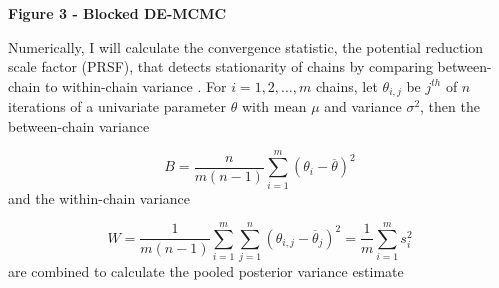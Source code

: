 \documentclass[12pt]{article}
\begin{document}
\vspace{5mm}

\centerline{\textbf{Figure 3 - Blocked DE-MCMC}}

\vspace{5mm}
	
    Numerically, I will calculate the \citet{GelRub1992} convergence statistic, the potential reduction scale factor (PRSF), that detects stationarity of chains by comparing between-chain to within-chain variance \citep{BroGel1998}. For $i = 1, 2, \dots, m$ chains, let $\theta_{i, j}$  be $j^{th}$ of $n$ iterations of a univariate parameter $\theta$ with mean $\mu$ and variance $\sigma^2$, then the between-chain variance
    
\begin{equation}
B = \frac{n}{m(n-1)}\sum_{i=1}^m(\theta_i - \overline\theta)^2
\end{equation}
and the within-chain variance

\begin{equation}
W = \frac{1}{m(n-1)}\sum_{i=1}^m \sum_{j=1}^n(\theta_{i,j} - \overline\theta_j)^2 = \frac{1}{m}\sum_{i=1}^m s_i^2
\end{equation}
are combined to calculate the pooled posterior variance estimate 
\end{document}
